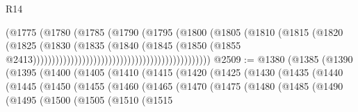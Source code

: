 \begin{lexlean}{R14}
\begin{coremodule}
{{{{{{{{{{{{{{{{{{{{{{{{{{{{{{{{{{{{{{{{{{{{{{{{{{{{{{{{{{{{{{{{{{{{{{{{{{{{{{{{{{{{{{{{{{{{{{{{{{{{{{{{{{                                                                (@1775
                                                                  (@1780
                                                                    (@1785
                                                                      (@1790
                                                                        (@1795
                                                                          (@1800
                                                                            (@1805
                                                                              (@1810
                                                                                (@1815
                                                                                  (@1820
                                                                                    (@1825
                                                                                      (@1830
                                                                                        (@1835
                                                                                          (@1840
                                                                                            (@1845
                                                                                              (@1850
                                                                                                (@1855
                                                                                                  @2413)))))))))))))))))))))))))))))))))))))))))))))))
@2509 := @1380
    (@1385
      (@1390
        (@1395
          (@1400
            (@1405
              (@1410
                (@1415
                  (@1420
                    (@1425
                      (@1430
                        (@1435
                          (@1440
                            (@1445
                              (@1450
                                (@1455
                                  (@1460
                                    (@1465
                                      (@1470
                                        (@1475
                                          (@1480
                                            (@1485
                                              (@1490
                                                (@1495
                                                  (@1500
                                                    (@1505
                                                      (@1510
                                                        (@1515
}}}}}}}}}}}}}}}}}}}}}}}}}}}}}}}}}}}}}}}}}}}}}}}}}}}}}}}}}}}}}}}}}}}}}}}}}}}}}}}}}}}}}}}}}}}}}}}}}}}}}}}}}}
\end{coremodule}
\end{lexlean}
